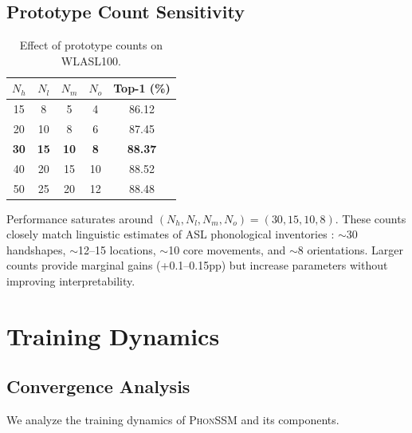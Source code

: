 \documentclass{article}
\theoremstyle{definition}
\theoremstyle{remark}
\newcommand{\phonssm}{\textsc{PhonSSM}}
\begin{document}
\subsection{Prototype Count Sensitivity}

\begin{table}[ht]
\caption{Effect of prototype counts on WLASL100.}
\label{tab:proto_sensitivity}
\vspace{-1mm}
\begin{center}
\begin{small}
\begin{tabular*}{\columnwidth}{@{\extracolsep{\fill}}ccccc@{}}
\toprule
$N_h$ & $N_l$ & $N_m$ & $N_o$ & Top-1 (\%) \\
\midrule
15 & 8 & 5 & 4 & 86.12 \\
20 & 10 & 8 & 6 & 87.45 \\
\textbf{30} & \textbf{15} & \textbf{10} & \textbf{8} & \textbf{88.37} \\
40 & 20 & 15 & 10 & 88.52 \\
50 & 25 & 20 & 12 & 88.48 \\
\bottomrule
\end{tabular*}
\end{small}
\end{center}
\vspace{-2mm}
\end{table}

Performance saturates around $(N_h, N_l, N_m, N_o) = (30, 15, 10, 8)$. These counts closely match linguistic estimates of ASL phonological inventories \citep{battison1978lexical}: $\sim$30 handshapes, $\sim$12--15 locations, $\sim$10 core movements, and $\sim$8 orientations. Larger counts provide marginal gains (+0.1--0.15pp) but increase parameters without improving interpretability.

\section{Training Dynamics}
\label{app:training}

\subsection{Convergence Analysis}

We analyze the training dynamics of \phonssm{} and its components.
\end{document}
